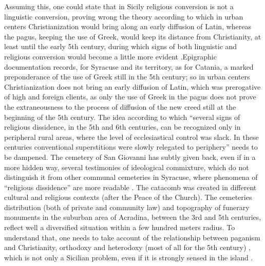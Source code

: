 \documentclass[amsthm,ebook]{saparticle}
\begin{document}
Assuming this, one could state that in Sicily religious conversion is not a linguistic conversion, proving wrong the theory according to which in urban centers Christianization would bring along an early diffusion of Latin, whereas the pagus, keeping the use of Greek, would keep its distance from Christianity, at least until the early 5th century, during which signs of both linguistic and religious conversion would become a little more evident \citep[545]{MANGANARO1993}.Epigraphic documentation records, for Syracuse and its territory, as for Catania, a marked preponderance of the use of Greek still in the 5th century; so in urban centers Christianization does not bring an early diffusion of Latin, which was prerogative of high and foreign clients, as only the use of Greek in the pagus does not prove the extraneousness to the process of diffusion of the new creed still at the beginning of the 5th century. The idea according
to which ``several signs of religious dissidence, in the 5th and 6th centuries, can be recognized only in peripheral rural areas, where the level of ecclesiastical control was slack. In these centuries conventional superstitions were slowly relegated to periphery'' \citep{CRACCORUGGINI1998} needs to be dampened.
The cemetery of San Giovanni has subtly given back, even if in a more hidden way, several testimonies of ideological commixture, which do not distinguish it from other communal cemeteries in Syracuse, where phenomena of ``religious dissidence'' are more readable \citep{SGARLATA2003}. The catacomb was created in different cultural and religious contexts (after the Peace of the Church). The cemeteries distribution (both of private and community law) and topography of funerary monuments in the suburban area of Acradina, between the 3rd and 5th centuries, reflect well a diversified situation within a few hundred meters radius. To understand that, one needs to take account of the relationship between paganism and Christianity, orthodoxy and heterodoxy (most of all for the 5th century) \citep{MACMULLEN1997}, which is not only a Sicilian problem, even if it is strongly sensed in the island \citep[59]{GRECO1999}.



\end{document}

